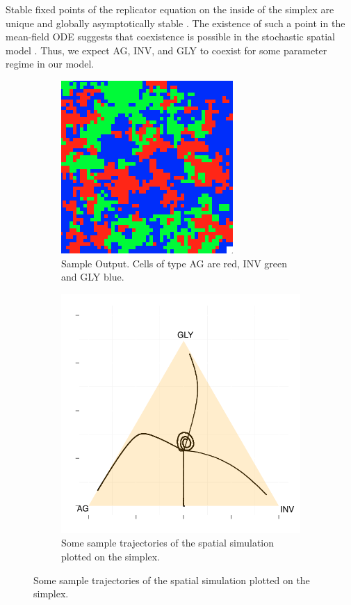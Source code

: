 \documentclass[12pt]{report}
\begin{document}
Stable fixed points of the replicator equation on the inside of the simplex are unique and globally asymptotically stable \cite{Hofbauer1998}. The existence of such a point in the mean-field ODE suggests that coexistence is possible in the stochastic spatial model \cite{Durrett1994}. Thus, we expect AG, INV, and GLY to coexist for some parameter regime in our model. 
\begin{figure}[H]
\centering
\begin{subfigure}[b]{0.4 \textwidth}
	\includegraphics[width = 0.9 \textwidth]{Diagrams/Basanta/sample}
	\caption{Sample Output. Cells of type AG are red, INV green and GLY blue.}
\end{subfigure}

\begin{subfigure}[b]{0.4 \linewidth}
\includegraphics[width = 0.9 \linewidth]{Diagrams/basanta_trajectories}
\caption{Some sample trajectories of the spatial simulation plotted on the simplex.}
\end{subfigure}
\end{figure}
\end{document}
